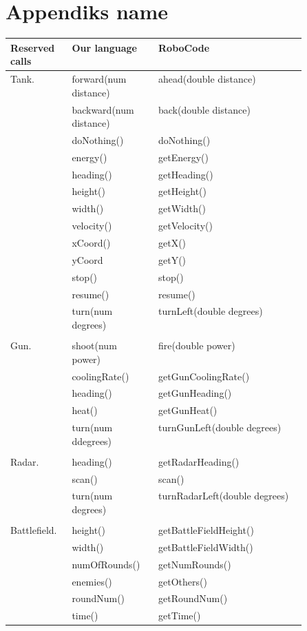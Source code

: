 \chapter{Appendiks name} \label{sec:ap1}
\begin{center}
    \begin{tabular}{ | l| l | p{0.5\linewidth} | }
    \hline
    Reserved calls & Our language & RoboCode \\ \hline
    Tank. & forward(num distance) & ahead(double distance)  \\ \hline
     & backward(num distance) & back(double distance)  \\ \hline
     & doNothing() & doNothing() \\ \hline
     & energy() & getEnergy() \\ \hline
     & heading() & getHeading() \\ \hline
     & height() & getHeight() \\ \hline
     & width() & getWidth()  \\ \hline
     & velocity() & getVelocity()  \\ \hline
     & xCoord() & getX() \\ \hline
     & yCoord & getY() \\ \hline
     & stop() & stop() \\ \hline
     & resume() & resume() \\ \hline
     & turn(num degrees) & turnLeft(double degrees)  \\ \hline
     & &  \\ \hline
    Gun. & shoot(num power) & fire(double power) \\ \hline
     & coolingRate() & getGunCoolingRate() \\ \hline
     & heading() & getGunHeading() \\ \hline
     & heat() & getGunHeat() \\ \hline
     & turn(num ddegrees) & turnGunLeft(double degrees)  \\ \hline
     & &  \\ \hline
    Radar. & heading() & getRadarHeading() \\ \hline
     & scan() & scan() \\ \hline
     & turn(num degrees) & turnRadarLeft(double degrees) \\ \hline
     & &  \\ \hline
    Battlefield. & height() & getBattleFieldHeight() \\ \hline
     & width() & getBattleFieldWidth() \\ \hline
     & numOfRounds() & getNumRounds() \\ \hline
     & enemies() & getOthers() \\ \hline
     & roundNum() & getRoundNum() \\ \hline
     & time() & getTime()  \\
    \hline
    \end{tabular}
\end{center}

